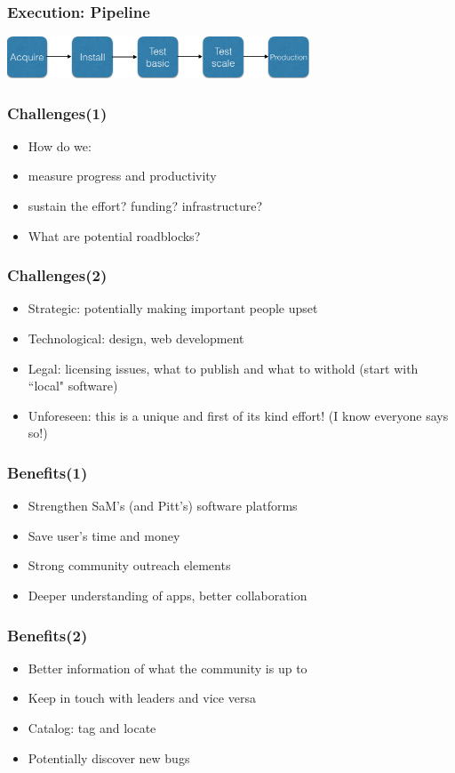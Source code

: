 \documentclass[hyperref={pdfpagelabels=false},12pt]{beamer}
\begin{document}
\begin{frame}
\frametitle{Execution: Pipeline}
\includegraphics[width=9cm]{workflow}
\end{frame}


\begin{frame}
\frametitle{Challenges(1)}
\begin{itemize}
\itemsep1em
\item
 How do we:
 \item
 measure progress and productivity
 \item
 sustain the effort? funding? infrastructure?
 \item
 What are potential roadblocks?
\end{itemize}
\end{frame}

\begin{frame}
\frametitle{Challenges(2)}
\begin{itemize}
\itemsep1em
\item 
Strategic: potentially making important people upset
\item
Technological: design, web development
\item
Legal: licensing issues, what to publish and what to withold (start with ``local" software)
\item
Unforeseen: this is a unique and first of its kind effort! (I know everyone says so!)
\end{itemize}
\end{frame}

\begin{frame}
\frametitle{Benefits(1)}
\begin{itemize}
\itemsep1em
\item Strengthen SaM's (and Pitt's) software platforms
\item
Save user's time and money
\item
Strong community outreach elements
\item
Deeper understanding of apps, better collaboration
\end{itemize}
\end{frame}

\begin{frame}
\frametitle{Benefits(2)}
\begin{itemize}
\itemsep1em
\item 
Better information of what the community is up to
\item
Keep in touch with leaders and vice versa
\item
Catalog: tag and locate
\item
Potentially discover new bugs
\end{itemize}
\end{frame}
\end{document}
